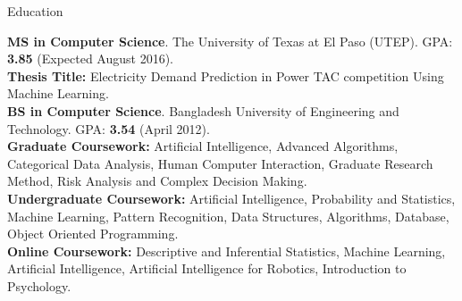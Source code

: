 \documentclass[]{mcdowellcv}
\begin{document}
	\makeheader
	
	
	\begin{cvsection}{Education}
		\begin{cvsubsection}{}{}{}
				\textbf{MS in Computer Science}. The University of Texas at El Paso (UTEP).  GPA: \textbf{3.85} (Expected August 2016). \\
				\textbf{Thesis Title:} Electricity Demand Prediction in Power TAC competition Using Machine Learning. \\
				\textbf{BS in Computer Science}. Bangladesh University of Engineering and Technology. GPA: \textbf{3.54} (April 2012).  \\
				\textbf{Graduate Coursework:} Artificial Intelligence, Advanced Algorithms, Categorical Data Analysis, Human Computer Interaction, Graduate Research Method, Risk Analysis and Complex Decision Making. \\
				\textbf{Undergraduate Coursework:} Artificial Intelligence, Probability and Statistics, Machine Learning, Pattern Recognition, Data Structures, Algorithms, Database, Object Oriented Programming. \\
				\textbf{Online Coursework:} Descriptive and Inferential Statistics, Machine Learning, Artificial Intelligence, Artificial Intelligence for Robotics, Introduction to Psychology.
		\end{cvsubsection}
	\end{cvsection}
\end{document}
